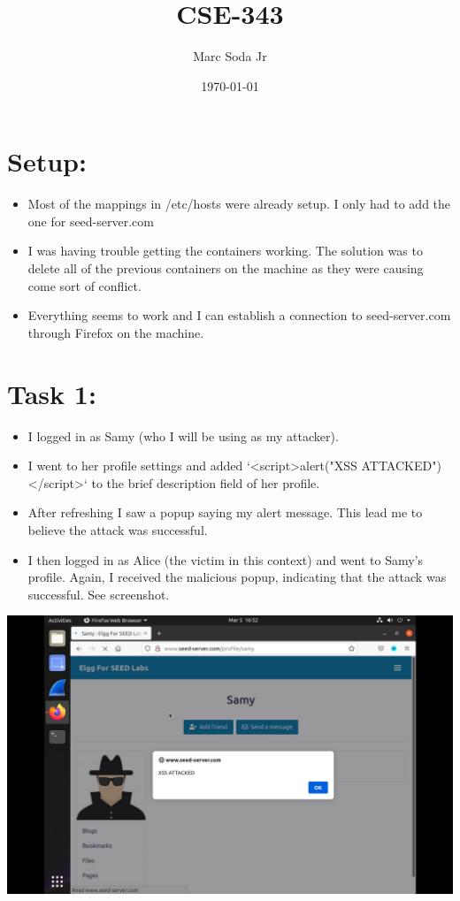\documentclass[11pt]{article}
\author{Marc Soda Jr}
\date{\today}
\title{CSE-343}
\begin{document}
\maketitle
\tableofcontents

\section*{Setup:}
\label{sec:org278fb66}
\begin{itemize}
\item Most of the mappings in /etc/hosts were already setup. I only had to add the one for seed-server.com
\item I was having trouble getting the containers working. The solution was to delete all of the previous containers on the machine as they were causing come sort of conflict.
\item Everything seems to work and I can establish a connection to seed-server.com through Firefox on the machine.
\end{itemize}
\section*{Task 1:}
\label{sec:orgd4a29f0}
\begin{itemize}
\item I logged in as Samy (who I will be using as my attacker).
\item I went to her profile settings and added `<script>alert("XSS ATTACKED")</script>` to the brief description field of her profile.
\item After refreshing I saw a popup saying my alert message. This lead me to believe the attack was successful.
\item I then logged in as Alice (the victim in this context) and went to Samy's profile. Again, I received the malicious popup, indicating that the attack was successful. See screenshot.
\end{itemize}
\begin{center}
\includegraphics[width=.9\linewidth]{./images/0.jpg}
\end{center}
\end{document}
